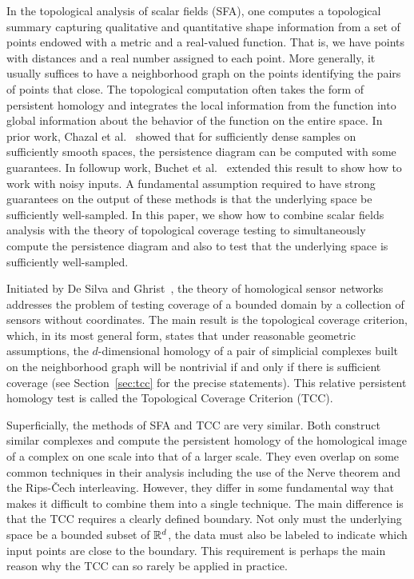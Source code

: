 
In the topological analysis of scalar fields (SFA), one computes a topological summary capturing qualitative and quantitative shape information from a set of points endowed with a metric and a real-valued function.
That is, we have points with distances and a real number assigned to each point.
More generally, it usually suffices to have a neighborhood graph on the points identifying the pairs of points that close.
The topological computation often takes the form of persistent homology and integrates the local information from the function into global information about the behavior of the function on the entire space.
In prior work, Chazal et al.~\cite{chazal09analysis} showed that for sufficiently dense samples on sufficiently smooth spaces, the persistence diagram can be computed with some guarantees.
In followup work, Buchet et al.~\cite{buchet15topological} extended this result to show how to work with noisy inputs.
A fundamental assumption required to have strong guarantees on the output of these methods is that the underlying space be sufficiently well-sampled.
In this paper, we show how to combine scalar fields analysis with the theory of topological coverage testing to simultaneously compute the persistence diagram and also to test that the underlying space is sufficiently well-sampled.

Initiated by De Silva and Ghrist~\cite{desilva06coordinate,desilva07coverage,desilva07homological}, the theory of homological sensor networks addresses the problem of testing coverage of a bounded domain by a collection of sensors without coordinates.
The main result is the topological coverage criterion, which, in its most general form, states that under reasonable geometric assumptions, the $d$-dimensional homology of a pair of simplicial complexes built on the neighborhood graph will be nontrivial if and only if there is sufficient coverage (see Section~\ref{sec:tcc} for the precise statements).
This relative persistent homology test is called the Topological Coverage Criterion (TCC).

Superficially, the methods of SFA and TCC are very similar.
Both construct similar complexes and compute the persistent homology of the homological image of a complex on one scale into that of a larger scale.
They even overlap on some common techniques in their analysis including the use of the Nerve theorem and the Rips-\v{C}ech interleaving.
However, they differ in some fundamental way that makes it difficult to combine them into a single technique.
The main difference is that the TCC requires a clearly defined boundary.
Not only must the underlying space be a bounded subset of $\mathbb{R}^d$, the data must also be labeled to indicate which input points are close to the boundary.
This requirement is perhaps the main reason why the TCC can so rarely be applied in practice.

